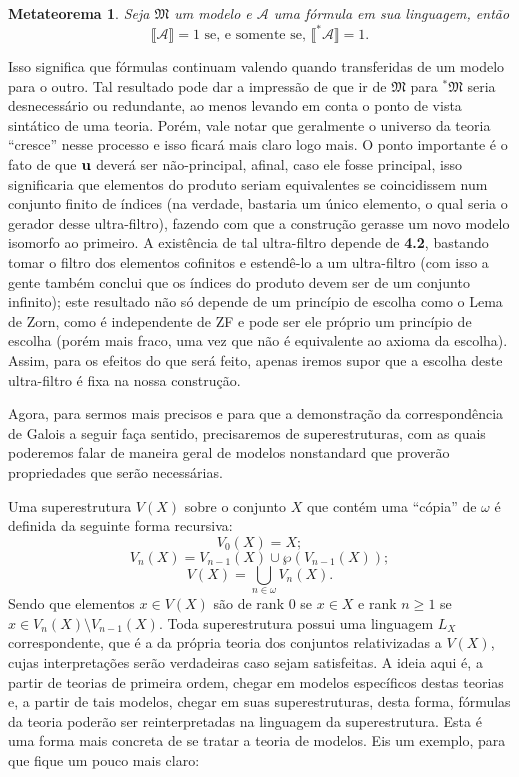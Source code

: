 \documentclass[12pt,a4paper]{article}
\newtheorem{mthrm}[mydef]{Metateorema}
\theoremstyle{definition}
\begin{document}
\begin{mthrm}
	
	Seja $\mathfrak{M}$ um modelo e $\mathscr{A}$ uma fórmula em sua linguagem, então $$ \llbracket\mathscr{A}  \rrbracket = 1 \text{ se, e somente se, }  \llbracket ^*\mathscr{A}  \rrbracket = 1.$$
	
\end{mthrm}

Isso significa que fórmulas continuam valendo quando transferidas de um modelo para o outro. Tal resultado pode dar a impressão de que ir de $\mathfrak{M}$ para $^*\mathfrak{M}$ seria desnecessário ou redundante, ao menos levando em conta o ponto de vista sintático de uma teoria. Porém, vale notar que geralmente o universo da teoria ``cresce'' nesse processo e isso ficará mais claro logo mais. O ponto importante é o fato de que $\bf{u}$ deverá ser não-principal, afinal, caso ele fosse principal, isso significaria que elementos do produto seriam equivalentes se coincidissem num conjunto finito de índices (na verdade, bastaria um único elemento, o qual seria o gerador desse ultra-filtro), fazendo com que a construção gerasse um novo modelo isomorfo ao primeiro. A existência de tal ultra-filtro depende de \textbf{4.2}, bastando tomar o filtro dos elementos cofinitos e estendê-lo a um ultra-filtro (com isso a gente também conclui que os índices do produto devem ser de um conjunto infinito); este resultado não só depende de um princípio de escolha como o Lema de Zorn, como é independente de ZF e pode ser ele próprio um princípio de escolha (porém mais fraco, uma vez que não é equivalente ao axioma da escolha). Assim, para os efeitos do que será feito, apenas iremos supor que a escolha deste ultra-filtro é fixa na nossa construção.

Agora, para sermos mais precisos e para que a demonstração da correspondência de Galois a seguir faça sentido, precisaremos de superestruturas, com as quais poderemos falar de maneira geral de modelos nonstandard que proverão propriedades que serão necessárias. 

Uma superestrutura $V(X)$ sobre o conjunto $X$ que contém uma ``cópia'' de $\omega$ é definida da seguinte forma recursiva: $$V_0(X)=X;$$ $$V_n(X)=V_{n-1}(X)\cup \wp(V_{n-1}(X));$$ $$V(X)=\bigcup_{n\in \omega}V_n(X).$$ Sendo que elementos $x\in V(X)$ são de rank $0$ se $x\in X$ e rank $n\geq 1$ se $x\in V_n(X)\setminus V_{n-1}(X)$. Toda superestrutura possui uma linguagem $L_X$ correspondente, que é a da própria teoria dos conjuntos relativizadas a $V(X)$, cujas interpretações serão verdadeiras caso sejam satisfeitas. A ideia aqui é, a partir de teorias de primeira ordem, chegar em modelos específicos destas teorias e, a partir de tais modelos, chegar em suas superestruturas, desta forma, fórmulas da teoria poderão ser reinterpretadas na linguagem da superestrutura. Esta é uma forma mais concreta de se tratar a teoria de modelos. Eis um exemplo, para que fique um pouco mais claro: 
\end{document}
